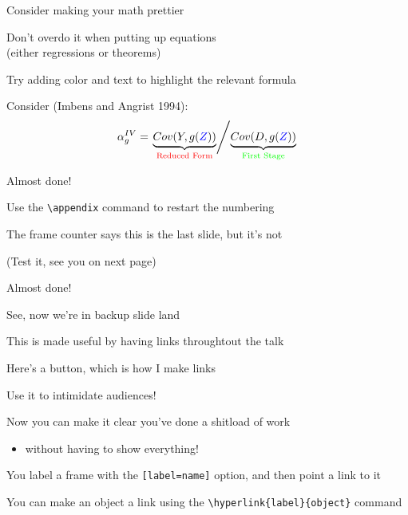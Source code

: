 \documentclass[11pt, aspectratio=169]{beamer}
\newenvironment{wideitemize}{\itemize\addtolength{\itemsep}{10pt}}{\enditemize}
\begin{document}
\begin{frame}{Consider making your math prettier}
  \begin{wideitemize}
    \item Don't overdo it when putting up equations\\(either regressions or theorems)
    \item Try adding color and text to highlight the relevant formula
    \item Consider (Imbens and Angrist 1994): 
      \begin{equation*}
        \alpha_{g}^{IV} = \left. \underbrace{Cov(Y, g(\textcolor{blue}{Z}))}_{\text{\textcolor{red}{Reduced Form}}} \middle/ \underbrace{Cov(D, g(\textcolor{blue}{Z}))}_{\text{\textcolor{green}{First Stage}}} \right.
      \end{equation*}
  \end{wideitemize}
\end{frame}


\begin{frame}{Almost done!}
  \begin{wideitemize}
  \item Use the \texttt{\textbackslash appendix} command to restart the numbering
  \item The frame counter says this is the last slide, but it's not
  \item (Test it, see you on next page)
  \end{wideitemize}
\end{frame}

\appendix

\begin{frame}[label=appendix_start]{Almost done!}
  \begin{wideitemize}
  \item See, now we're in backup slide land
  \item This is made useful by having links throughtout the talk
  \item Here's a button, which is how I make links \hyperlink{appendix_end}{}
  \end{wideitemize}
\end{frame}

\begin{frame}[label=appendix_end]{Use it to intimidate audiences!}
  \begin{wideitemize}
    \item[] Now you can make it clear you've done a shitload of work
      \begin{itemize}
      \item[]  without having to show everything! \hyperlink{appendix_start}{}
      \end{itemize}
    \item[] You label a frame with the \texttt{[label=name]} option, and then point a link to it
    \item[] You can make an object a link using the \texttt{\textbackslash hyperlink\{label\}\{object\}} command
  \end{wideitemize}
\end{frame}
\end{document}
